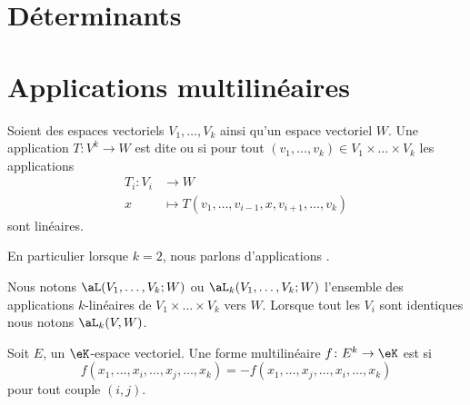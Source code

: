 
\section{Déterminants}
\label{SecGYzHWs}


\section{Applications multilinéaires}

\begin{definition}       \label{DefFRHooKnPCT}
	Soient des espaces vectoriels \( V_1,\ldots,V_k\) ainsi qu'un espace vectoriel \( W\). Une application \(T \colon V^k\to W  \) est dite  ou  si pour tout \( (v_1, \ldots,v_k)\in V_1\times \ldots\times V_k\) les applications
	\begin{equation}
		\begin{aligned}
			T_i\colon V_i & \to W                                                 \\
			x             & \mapsto T(v_1,\ldots, v_{i-1}, x,v_{i+1},\ldots, v_k)
		\end{aligned}
	\end{equation}
	sont linéaires.

	En particulier lorsque \( k=2\), nous parlons d'applications .

	Nous notons \( \aL(V_1,\ldots,V_k;W)\) ou \( \aL_k(V_1,\ldots,V_k;W)\) l'ensemble des applications \( k\)-linéaires de \( V_1\times \ldots \times V_k\) vers \( W\). Lorsque tout les \( V_i\) sont identiques nous notons \( \aL_k(V,W)\).
\end{definition}


\begin{definition}	\label{DEFooZFCKooGIoYrE}
	Soit \( E\), un \( \eK\)-espace vectoriel. Une forme multilinéaire \(f \colon E^k\to \eK  \) est  si
	\begin{equation}
		f(x_1,\ldots,x_i,\ldots,x_j,\ldots,x_k)=-f(x_1,\ldots,x_j,\ldots,x_i,\ldots,x_k)
	\end{equation}
	pour tout couple \( (i,j)\).
\end{definition}

